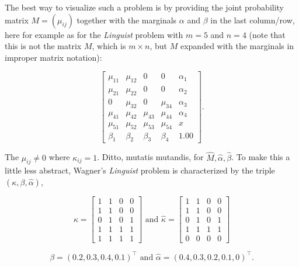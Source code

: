 \documentclass[phd,12pt,oneside]{ubcthesis}
\begin{document}
The best way to visualize such a problem is by providing the joint
probability matrix $M=(\mu_{ij})$ together with the marginals $\alpha$
and $\beta$ in the last column/row, here for example as for the
\emph{Linguist} problem with $m=5$ and $n=4$ (note that this is not
the matrix $M$, which is $m\times{}n$, but $M$ expanded with the
marginals in improper matrix notation):

\begin{equation}
  \label{eq:m3}
      \left[
      \begin{array}{ccccc}
        \mu_{11} & \mu_{12} & 0 & 0 & \alpha_{1} \\
        \mu_{21} & \mu_{22} & 0 & 0 & \alpha_{2} \\
        0 & \mu_{32} & 0 & \mu_{34} & \alpha_{3} \\
        \mu_{41} & \mu_{42} & \mu_{43} & \mu_{44} & \alpha_{4} \\
        \mu_{51} & \mu_{52} & \mu_{53} & \mu_{54} & x \\
        \beta_{1} & \beta_{2} & \beta_{3} & \beta_{4} & 1.00
      \end{array}
\right].
\end{equation}

{\noindent}The $\mu_{ij}\neq{}0$ where $\kappa_{ij}=1$. Ditto, mutatis mutandis,
for $\hat{M},\hat{\alpha},\hat{\beta}$. To make this a little less
abstract, Wagner's \emph{Linguist} problem is characterized by the
triple $(\kappa,\beta,\hat{\alpha})$,

\begin{equation}
  \label{eq:m4}
  \kappa=\left[
  \begin{array}{cccc}
    1 & 1 & 0 & 0 \\
    1 & 1 & 0 & 0 \\
    0 & 1 & 0 & 1 \\
    1 & 1 & 1 & 1 \\
    1 & 1 & 1 & 1
  \end{array}
\right]\mbox{ and }
  \hat{\kappa}=\left[
  \begin{array}{cccc}
    1 & 1 & 0 & 0 \\
    1 & 1 & 0 & 0 \\
    0 & 1 & 0 & 1 \\
    1 & 1 & 1 & 1 \\
    0 & 0 & 0 & 0
  \end{array}
\right]
\end{equation}

\begin{equation}
  \label{eq:m5}
  \beta=(0.2,0.3,0.4,0.1)^{\top}\mbox{ and }\hat{\alpha}=(0.4,0.3,0.2,0.1,0)^{\top}.
\end{equation}
\end{document}
